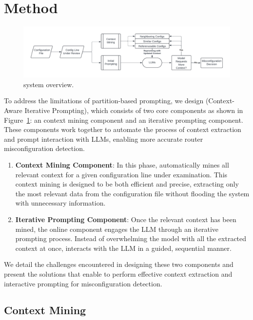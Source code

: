 \section{Method}
\label{sec:method}

\begin{figure}[t]
    \centering
    \includegraphics[width=\linewidth]{figs/caip.pdf}
    \caption{\sysname{} system overview.}
    \label{fig:overview}
\end{figure}

To address the limitations of partition-based prompting, we design \sysname{} (Context-Aware Iterative Prompting), which consists of two core components as shown in Figure~\ref{fig:overview}: an context mining component and an iterative prompting component. These components work together to automate the process of context extraction and prompt interaction with LLMs, enabling more accurate router misconfiguration detection.
\begin{enumerate}
    \item \textbf{Context Mining Component}:
In this phase, \sysname{} automatically mines all relevant context for a given configuration line under examination. This context mining is designed to be both efficient and precise, extracting only the most relevant data from the configuration file without flooding the system with unnecessary information.
    \item \textbf{Iterative Prompting Component}:
Once the relevant context has been mined, the online component engages the LLM through an iterative prompting process. Instead of overwhelming the model with all the extracted context at once, \sysname{} interacts with the LLM in a guided, sequential manner.
\end{enumerate}

We detail the challenges encountered in designing these two components and present the solutions that enable \sysname{} to perform effective context extraction and interactive prompting for misconfiguration detection.
\subsection{Context Mining}\label{mining_method}
